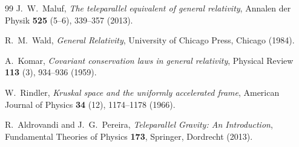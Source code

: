 \documentclass[a4paper]{article}
\begin{document}
\begin{thebibliography}{99}
J.~W.~Maluf,
\textit{The teleparallel equivalent of general relativity},
Annalen der Physik \textbf{525} (5--6), 339--357 (2013).

R.~M.~Wald,
\textit{General Relativity},
University of Chicago Press, Chicago (1984).

A.~Komar,
\textit{Covariant conservation laws in general relativity},
Physical Review \textbf{113} (3), 934--936 (1959).

W.~Rindler,
\textit{Kruskal space and the uniformly accelerated frame},
American Journal of Physics \textbf{34} (12), 1174--1178 (1966).

R.~Aldrovandi and J.~G.~Pereira,
\textit{Teleparallel Gravity: An Introduction},
Fundamental Theories of Physics \textbf{173}, Springer, Dordrecht (2013).

\end{thebibliography}
\end{document}
